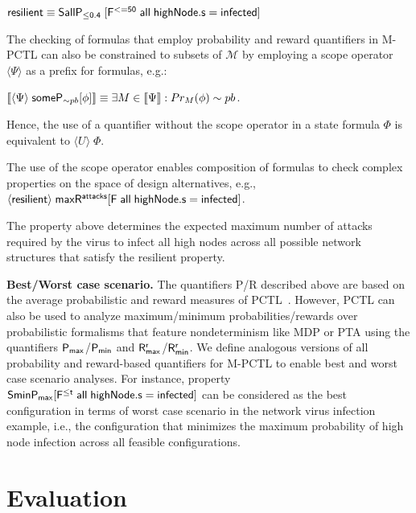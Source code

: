 \documentclass[10pt,journal,compsoc]{IEEEtran}
\begin{document}
\centerline{${\sf resilient \equiv  SallP_{\leq 0.4}\; [ F^{<=50} \; all \; highNode.s=infected]}$}

The checking of formulas that employ probability and reward quantifiers in M-PCTL can also be constrained to subsets of $\mathcal{M}$ by employing a scope operator $\langle\Psi\rangle$ as a prefix for formulas, e.g.:

\centerline{
$ \llbracket \langle \Psi \rangle \; {\sf someP}_{\sim pb} [\phi] \rrbracket \equiv  \exists M \in \llbracket \Psi \rrbracket : Pr_M(\phi) \sim pb$.}

Hence, the use of a quantifier without the scope operator in a state formula $\Phi$ is equivalent to $\langle U \rangle \; \Phi$. %

The use of the scope operator enables composition of formulas to check complex properties on the space of design alternatives, e.g., ${\sf \langle resilient \rangle\;  maxR^{attacks} [F \; all \; highNode.s=infected]}$.


The property above determines the expected maximum number of attacks required by the virus to infect all high nodes across all possible network structures that satisfy the {\sf resilient} property.

\noindent
{\bf Best/Worst case scenario.} The quantifiers {\sf P/R} described above are based on the average probabilistic and reward measures of PCTL~\cite{DBLP:conf/sfm/KwiatkowskaNP07}. However, PCTL can also be used to analyze maximum/minimum probabilities/rewards over probabilistic formalisms that feature nondeterminism like MDP or PTA using the quantifiers ${\sf P_{max}}$/${\sf P_{min}}$ and ${\sf R^r_{max}}$/${\sf R^r_{min}}$\cite{DBLP:conf/atva/KwiatkowskaP13}. We define analogous versions of all probability and reward-based quantifiers for M-PCTL to enable best and worst case scenario analyses. For instance, property ${\sf SminP_{max} [F^{\leq t}\; all\; highNode.s=infected]}$ can be considered as the best configuration in terms of worst case scenario in the network virus infection example, i.e., the configuration that minimizes the maximum probability of high node infection across all feasible configurations.

\section{Evaluation}
\label{sec:evaluation}
\end{document}
